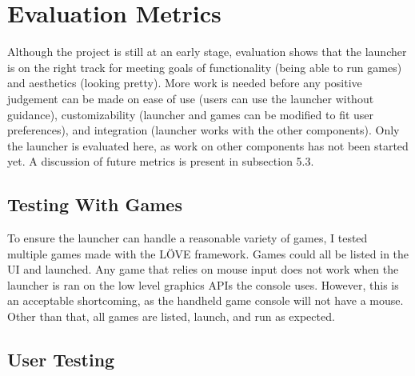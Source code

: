 \documentclass[10pt,twocolumn]{article}
\begin{document}

\section{Evaluation Metrics}

Although the project is still at an early stage, evaluation shows that the
launcher is on the right track for meeting goals of functionality
(being able to run games) and aesthetics (looking pretty). More work is needed
before any positive judgement can be made on ease of use (users can use the
launcher without guidance), customizability (launcher and games can be
modified to fit user preferences), and integration (launcher works with the
other components). Only the launcher is evaluated here, as work on other
components has not been started yet. A discussion of future metrics is present
in subsection 5.3.

\subsection{Testing With Games}

To ensure the launcher can handle a reasonable variety of games, I tested
multiple games made with the LÖVE framework.
Games could all be listed in the UI
and launched. Any game that relies on mouse input does not work when the
launcher is ran on the low level graphics APIs the console uses. However, this
is an acceptable shortcoming, as the handheld game console will not have a
mouse. Other than that, all games are listed, launch, and run as expected.

\subsection{User Testing}
\end{document}
